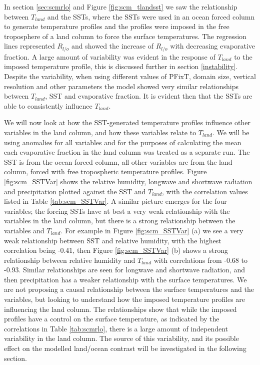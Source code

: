 In section \ref{sec:scmrlo} and Figure \ref{fig:scm_tlandsst} we saw the 
relationship between $T_{land}$ and the SSTs, where the SSTs were used in an 
ocean forced column to generate temperature profiles and the profiles were imposed in 
the free troposphere of a land column to force the surface temperatures.  The 
regression lines represented $R_{l/o}$ and showed the increase of $R_{l/o}$ with 
decreasing evaporative fraction.  A large amount of variability was evident in 
the response of $T_{land}$ to the imposed temperature profile, this is discussed 
further in section \ref{instability}.  Despite the variability,
when using different values of PFixT, domain size, vertical resolution and other 
parameters the model showed very similar relationships between $T_{land}$, SST 
and evaporative fraction. It is evident then that the SSTs are able to 
consistently influence $T_{land}$.

We will now look at how the SST-generated temperature profiles influence other 
variables in the land column, and how these variables relate to $T_{land}$.  We 
will be using anomalies for all variables and for the purposes of calculating 
the mean each evaporative fraction in the land column was treated as a separate 
run.  The SST is from the ocean forced column, all other variables are from the land 
column, forced with free tropospheric temperature profiles. Figure 
\ref{fig:scm_SSTVar} shows the relative humidity, longwave and shortwave 
radiation and precipitation plotted against the SST and $T_{land}$, with the 
correlation values listed in Table \ref{tab:scm_SSTVar}. A similar picture 
emerges for the four variables; the forcing SSTs have at best a very weak 
relationship with the variables in the land column, but there is a strong 
relationship between the variables and $T_{land}$. For example in Figure 
\ref{fig:scm_SSTVar} (a) we see a very weak relationship between SST and 
relative humidity, with the highest correlation being -0.41, then Figure 
\ref{fig:scm_SSTVar} (b) shows a strong relationship between relative humidity 
and $T_{land}$ with correlations from -0.68 to -0.93. Similar relationships are 
seen for longwave and shortwave radiation, and then precipitation has a weaker 
relationship with the surface temperatures. We are not proposing a causal 
relationship between the surface temperatures and the variables, but looking to 
understand how the imposed temperature profiles are influencing the land column.  
The relationships show that while the imposed profiles have a control on the 
surface temperature, as indicated by the correlations in Table \ref{tab:scmrlo}, 
there is a large amount of independent variability in the land column. The 
source of this variability, and its possible effect on the modelled land/ocean 
contrast will be investigated in the following section.

